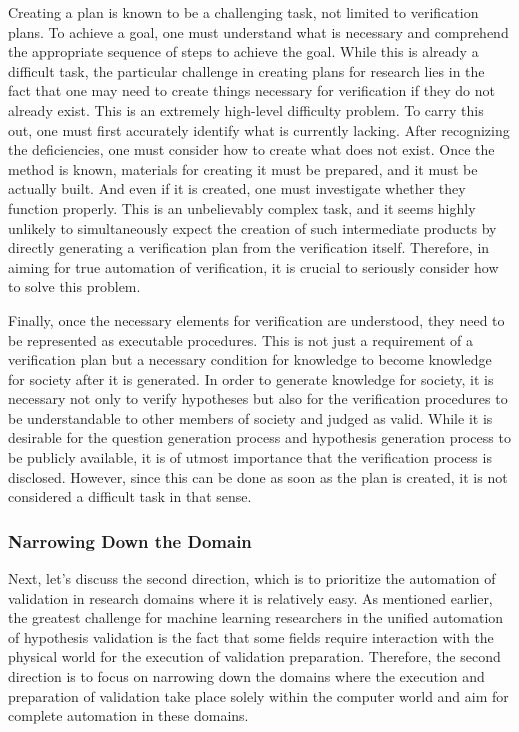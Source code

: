 \documentclass{book}
\begin{document}
Creating a plan is known to be a challenging task, not limited to verification plans. To achieve a goal, one must understand what is necessary and comprehend the appropriate sequence of steps to achieve the goal. While this is already a difficult task, the particular challenge in creating plans for research lies in the fact that one may need to create things necessary for verification if they do not already exist. This is an extremely high-level difficulty problem. To carry this out, one must first accurately identify what is currently lacking. After recognizing the deficiencies, one must consider how to create what does not exist. Once the method is known, materials for creating it must be prepared, and it must be actually built. And even if it is created, one must investigate whether they function properly. This is an unbelievably complex task, and it seems highly unlikely to simultaneously expect the creation of such intermediate products by directly generating a verification plan from the verification itself. Therefore, in aiming for true automation of verification, it is crucial to seriously consider how to solve this problem.

Finally, once the necessary elements for verification are understood, they need to be represented as executable procedures. This is not just a requirement of a verification plan but a necessary condition for knowledge to become knowledge for society after it is generated. In order to generate knowledge for society, it is necessary not only to verify hypotheses but also for the verification procedures to be understandable to other members of society and judged as valid. While it is desirable for the question generation process and hypothesis generation process to be publicly available, it is of utmost importance that the verification process is disclosed. However, since this can be done as soon as the plan is created, it is not considered a difficult task in that sense.

\subsubsection{Narrowing Down the Domain}

Next, let's discuss the second direction, which is to prioritize the automation of validation in research domains where it is relatively easy. As mentioned earlier, the greatest challenge for machine learning researchers in the unified automation of hypothesis validation is the fact that some fields require interaction with the physical world for the execution of validation preparation. Therefore, the second direction is to focus on narrowing down the domains where the execution and preparation of validation take place solely within the computer world and aim for complete automation in these domains.
\end{document}
